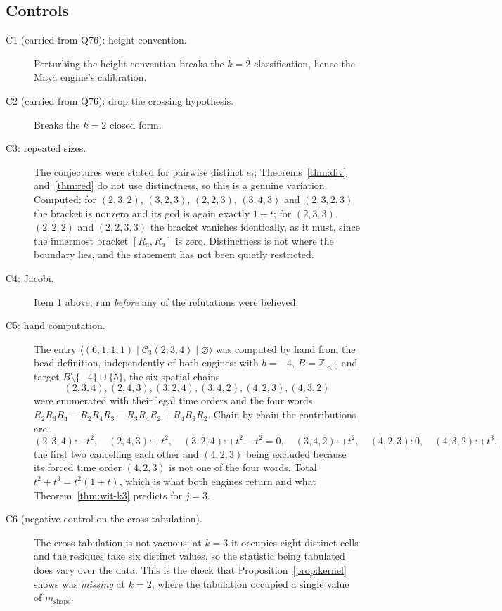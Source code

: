 \documentclass[11pt]{article}
\theoremstyle{definition}
\newcommand{\Z}{\mathbb{Z}}
\newcommand{\Ck}{\mathcal{C}}
\begin{document}
\subsection*{Controls}

\begin{description}
\item[C1 (carried from Q76): height convention.] Perturbing the height convention breaks the
$k=2$ classification, hence the Maya engine's calibration.
\item[C2 (carried from Q76): drop the crossing hypothesis.] Breaks the $k=2$ closed form.
\item[C3: repeated sizes.] The conjectures were stated for pairwise distinct $e_i$;
Theorems~\ref{thm:div} and~\ref{thm:red} do not use distinctness, so this is a genuine variation.
Computed: for $(2,3,2)$, $(3,2,3)$, $(2,2,3)$, $(3,4,3)$ and $(2,3,2,3)$ the bracket is nonzero
and its gcd is again exactly $1+t$; for $(2,3,3)$, $(2,2,2)$ and $(2,2,3,3)$ the bracket vanishes
identically, as it must, since the innermost bracket $[R_a,R_a]$ is zero. Distinctness is not
where the boundary lies, and the statement has not been quietly restricted.
\item[C4: Jacobi.] Item 1 above; run \emph{before} any of the refutations were believed.
\item[C5: hand computation.] The entry $\langle(6,1,1,1)\mid\Ck_3(2,3,4)\mid\varnothing\rangle$
was computed by hand from the bead definition, independently of both engines: with $b=-4$,
$B=\Z_{<0}$ and target $B\setminus\{-4\}\cup\{5\}$, the six spatial chains
\[
(2,3,4),(2,4,3),(3,2,4),(3,4,2),(4,2,3),(4,3,2)
\]
were enumerated with their legal time orders and the four words
$R_2R_3R_4-R_2R_4R_3-R_3R_4R_2+R_4R_3R_2$. Chain by chain the contributions are
\[
(2,3,4)\colon -t^2,\quad
(2,4,3)\colon +t^2,\quad
(3,2,4)\colon +t^2-t^2=0,\quad
(3,4,2)\colon +t^2,\quad
(4,2,3)\colon 0,\quad
(4,3,2)\colon +t^3,
\]
the first two cancelling each other and $(4,2,3)$ being excluded because its forced time order
$(4,2,3)$ is not one of the four words. Total $t^2+t^3=t^2(1+t)$, which is what both engines
return and what Theorem~\ref{thm:wit-k3} predicts for $j=3$.
\item[C6 (negative control on the cross-tabulation).] The cross-tabulation is not vacuous: at
$k=3$ it occupies eight distinct cells and the residues take six distinct values, so the
statistic being tabulated does vary over the data. This is the check that
Proposition~\ref{prop:kernel} shows was \emph{missing} at $k=2$, where the tabulation occupied a
single value of $m_{\mathrm{shape}}$.
\end{description}
\end{document}
